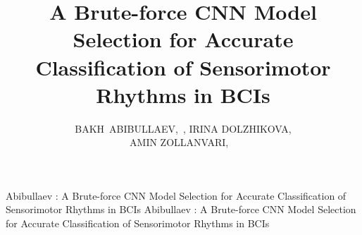 \documentclass{ieeeaccess}
\begin{document}
    
\history{}
\doi{}

\title{A Brute-force CNN Model Selection for Accurate Classification of Sensorimotor Rhythms in BCIs}

\author{\uppercase{Bakh~Abibullaev},~, 
    \uppercase{Irina Dolzhikova},\\ 
    \uppercase{Amin Zollanvari}, ~} 

\address[1]{Department of Robotics and Mechatronics, Nazarbayev University, 010000, Kazakhstan (e-mail: berdakh.abibullaev@nu.edu.kz)} 
\address[2]{Department of Electrical Engineering, Nazarbayev University, 010000, Kazakhstan (e-mail: ifedorova@nu.edu.kz)}        
\address[3]{Department of Electrical Engineering, Nazarbayev University, 010000, Kazakhstan (e-mail: amin.zollanvari@nu.edu.kz)}        
\markboth
{Abibullaev \headeretal: A Brute-force CNN Model Selection for Accurate Classification of Sensorimotor Rhythms in BCIs}
{Abibullaev \headeretal: A Brute-force CNN Model Selection for Accurate Classification of Sensorimotor Rhythms in BCIs}

\end{document}

